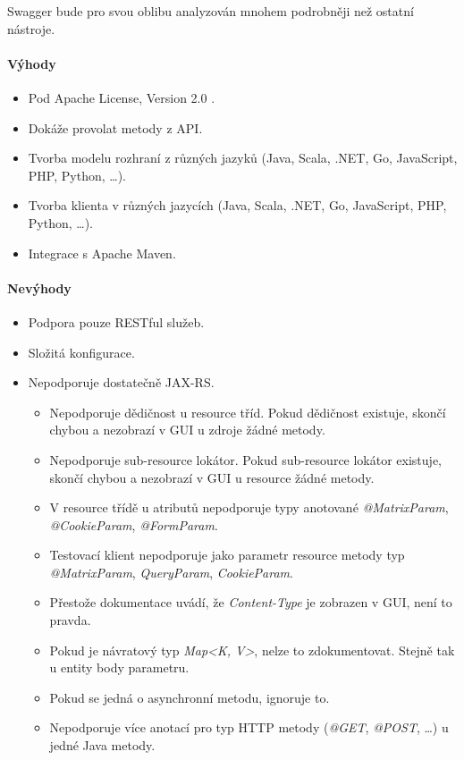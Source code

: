 \documentclass[11pt,twoside,a4paper]{book}
\begin{document}
Swagger bude pro svou oblibu analyzován mnohem podrobněji než ostatní nástroje.

\paragraph{Výhody}

\begin{itemize}
  \item Pod Apache License, Version 2.0 \cite{ApacheLic04}.
  \item Dokáže provolat metody z API.
  \item Tvorba modelu rozhraní z různých jazyků (Java, Scala, .NET, Go, JavaScript, PHP,
Python, \ldots).
  \item Tvorba klienta v různých jazycích (Java, Scala, .NET, Go, JavaScript, PHP, Python,
\ldots).
\item Integrace s Apache Maven.
\end{itemize}

\paragraph{Nevýhody}

\begin{itemize}
  \item Podpora pouze RESTful služeb.
  \item Složitá konfigurace.
  \item Nepodporuje dostatečně JAX-RS.
  \begin{itemize}
    \item Nepodporuje dědičnost u resource tříd. Pokud dědičnost existuje, skončí chybou a
nezobrazí v GUI u zdroje žádné metody.
    \item Nepodporuje sub-resource lokátor. Pokud sub-resource lokátor existuje,
    skončí chybou a nezobrazí v GUI u resource žádné metody.
    \item V resource třídě u atributů nepodporuje typy anotované {\em
    @MatrixParam}, {\em @CookieParam}, {\em @FormParam}.
    \item Testovací klient nepodporuje jako parametr resource metody typ
{\em @MatrixParam}, {\em QueryParam}, {\em CookieParam}.
    \item Přestože dokumentace uvádí, že {\em Content-Type} je zobrazen v GUI, není to
pravda.
    \item Pokud je návratový typ {\em Map<K, V>}, nelze to zdokumentovat. Stejně
    tak u entity body parametru.
    \item Pokud se jedná o asynchronní metodu, ignoruje to.
    \item Nepodporuje více anotací pro typ HTTP metody ({\em @GET}, {\em @POST},
    \ldots) u jedné Java metody.
\end{itemize}
\end{itemize}
\end{document}
